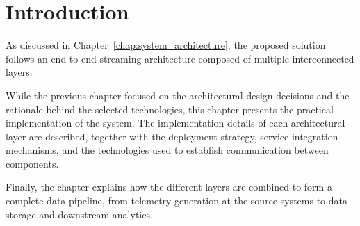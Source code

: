 \section{Introduction} As discussed in Chapter~\ref{chap:system_architecture}, the proposed solution follows an end-to-end streaming architecture composed of multiple interconnected layers. 

While the previous chapter focused on the architectural design decisions and the rationale behind the selected technologies, this chapter presents the practical implementation of the system. The implementation details of each architectural layer are described, together with the deployment strategy, service integration mechanisms, and the technologies used to establish communication between components. 

Finally, the chapter explains how the different layers are combined to form a complete data pipeline, from telemetry generation at the source systems to data storage and downstream analytics.